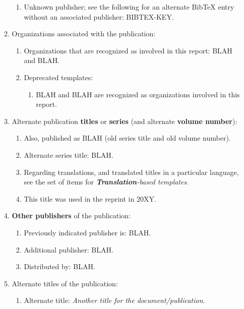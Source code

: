 \documentclass[letter,12pt]{article}
\begin{document}
\begin{enumerate}
\begin{enumerate}
\begin{enumerate}
		\item Unknown publisher; see the following for an alternate BibTeX entry without an associated publisher: BIBTEX-KEY.
		\end{enumerate}
	\item Organizations associated with the publication: \vspace{-0.2cm}
		\begin{enumerate} \itemsep -2pt
		\item Organizations that are recognized as involved in this report: BLAH and BLAH.
		\item Deprecated templates: \vspace{-0.1cm}
			\begin{enumerate} \itemsep -1pt
			\item BLAH and BLAH are recognized as organizations involved in this report.
			\end{enumerate}
		\end{enumerate}
	\item Alternate publication {\bf titles} or {\bf series} (and alternate {\bf volume number}): \vspace{-0.2cm}
		\begin{enumerate} \itemsep -2pt
		\item Also, published as BLAH (old series title and old volume number).
		\item Alternate series title: BLAH.
		\item Regarding translations, and translated titles in a particular language, see the set of items for {\it {\bf Translation}-based templates}.
		\item This title was used in the reprint in 20XY.
		\end{enumerate}
	\item {\bf Other publishers} of the publication: \vspace{-0.2cm}
		\begin{enumerate} \itemsep -2pt
		\item Previously indicated publisher is: BLAH.
		\item Additional publisher: BLAH.
		\item Distributed by: BLAH.
		\end{enumerate}
	\item Alternate titles of the publication: \vspace{-0.2cm}
		\begin{enumerate} \itemsep -2pt
		\item Alternate title: {\it Another title for the document/publication}.

\end{enumerate}
\end{enumerate}
\end{enumerate}
\end{document}
